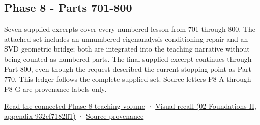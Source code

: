 \subsection{Phase 8 - Parts 701-800}\label{phase-8---parts-701-800}

Seven supplied excerpts cover every numbered lesson from 701 through 800. The attached set includes an unnumbered eigenanalysis-conditioning repair and an SVD geometric bridge; both are integrated into the teaching narrative without being counted as numbered parts. The final supplied excerpt continues through Part 800, even though the request described the current stopping point as Part 770. This ledger follows the complete supplied set. Source letters P8-A through P8-G are provenance labels only.

\href{Continuous\%20Notes/Computing\%20Foundations\%20-\%20From\%20Bits\%20to\%20C++\%20and\%20Systems\%20APIs\#The\%20graphics\%20problem\%20hiding\%20inside\%20a\%20matrix\%20equation}{Read the connected Phase 8 teaching volume} · \href{}{Visual recall (02-Foundations-II, appendix-932cf7182ff1)} · \hyperref[appendix-a103e7846d21]{Source provenance}

